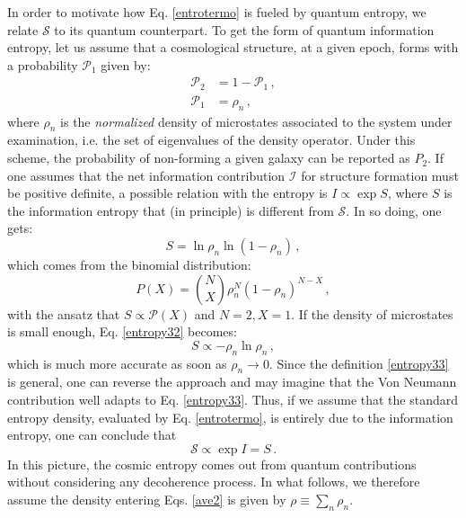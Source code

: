 \documentclass[nofootinbib,prd,superscriptaddress,showpacs,showkeys,]{revtex4}
\begin{document}
In order to motivate how Eq. \eqref{entrotermo} is fueled by quantum entropy, we relate $\mathcal S$ to its quantum counterpart. To get the form of quantum information entropy, let us assume that a cosmological structure, at a given epoch, forms with a  probability $\mathcal P_1$ given by:
\begin{subequations}\label{prob1}
\begin{align}
\mathcal P_2&=1-\mathcal P_1\,,\\
\mathcal P_1&=\rho_n\,,
\end{align}
\end{subequations}
where $\rho_n$ is the \emph{normalized} density of microstates associated to the system under examination, i.e. the set of eigenvalues of the density operator. Under this scheme, the probability of non-forming a given galaxy can be reported as $P_2$.
If one assumes that the net information contribution  $\mathcal I$ for structure formation must be positive definite, a possible relation with the entropy is $I\propto \exp S$, where $S$ is the information entropy that (in principle) is different from $\mathcal S$. In so doing, one gets:
\begin{equation}\label{entropy32}
S=\ln\rho_n\ln(1-\rho_n)\,,
\end{equation}
which comes from  the binomial distribution:
\begin{equation}\label{bi}
P(X)={N\choose X}\rho_n^N(1-\rho_n)^{N-X}\,,
\end{equation}
with the ansatz that $S\propto \mathcal P(X)$ and $N=2, X=1$.
If the density of microstates is small enough, Eq. \eqref{entropy32} becomes:
\begin{equation}\label{entropy33}
S\propto-\rho_n\ln\rho_n\,,
\end{equation}
which is much more accurate as soon as $\rho_n\rightarrow0$.
Since the definition \eqref{entropy33} is general, one can reverse the approach and may imagine that the Von Neumann contribution well adapts to Eq. \eqref{entropy33}. Thus, if we assume that the standard entropy density, evaluated by Eq. \eqref{entrotermo}, is entirely due to the information entropy, one can conclude that
\begin{equation}\label{uguaglianza}
\mathcal S\propto \exp I =S\,.
\end{equation}
In this picture, the cosmic entropy comes out from   quantum contributions without considering  any decoherence process. In what follows, we therefore assume the density entering Eqs. \eqref{ave2} is given by $\rho\equiv\sum_n \rho_n$.
\end{document}
